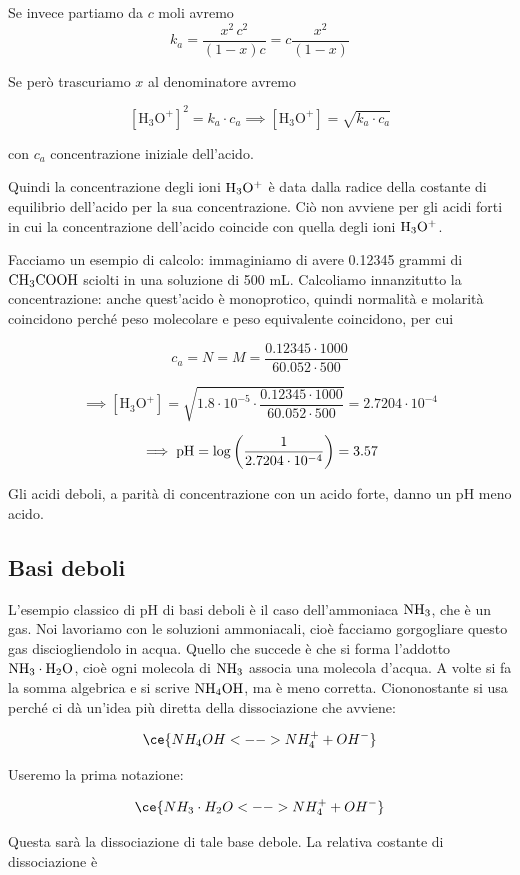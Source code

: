 Se invece partiamo da $c$ moli avremo
$$k_a = \frac{x^2 \, c^2}{(1-x)c}= c \frac{x^2}{(1-x)}$$

Se però trascuriamo $x$ al denominatore avremo

$$[\text{H}_3\text{O}^+]^2= k_a \cdot c_a \implies [\text{H}_3\text{O}^+] = \sqrt{k_a \cdot c_a}$$

con $c_a$ concentrazione iniziale dell'acido.

Quindi la concentrazione degli ioni $\rm H_3O^+$ è data dalla radice della costante di equilibrio dell'acido per la sua concentrazione. Ciò non avviene per gli acidi forti in cui la concentrazione dell'acido coincide con quella degli ioni $\rm H_3O^+$.

Facciamo un esempio di calcolo: immaginiamo di avere 0.12345 grammi di $\rm CH_3COOH$ sciolti in una soluzione di 500 mL. Calcoliamo innanzitutto la concentrazione: anche quest'acido è monoprotico, quindi normalità e molarità coincidono perché peso molecolare e peso equivalente coincidono, per cui

$$c_a=N=M=\frac{0.12345 \cdot 1000}{60.052 \cdot 500}$$

$$\implies [\text{H}_3\text{O}^+]=\sqrt{1.8 \cdot 10^{-5} \cdot \frac{0.12345 \cdot 1000}{60.052 \cdot 500}}=2.7204 \cdot 10^{-4}$$

$$\implies \rm pH=\log \left( \frac{1}{2.7204 \cdot 10^{-4}} \right)=3.57$$

Gli acidi deboli, a parità di concentrazione con un acido forte, danno un pH meno acido. 

\subsection{Basi deboli}

L'esempio classico di pH di basi deboli è il caso dell'ammoniaca $\rm NH_3$, che è un gas. Noi lavoriamo con le soluzioni ammoniacali, cioè facciamo gorgogliare questo gas disciogliendolo in acqua. Quello che succede è che si forma l'addotto $\rm NH_3 \cdot H_2O$, cioè ogni molecola di $\rm NH_3$ associa una molecola d'acqua. A volte si fa la somma algebrica e si scrive $\rm NH_4OH$, ma è meno corretta. Ciononostante si usa perché ci dà un'idea più diretta della dissociazione che avviene:

$$\ce{NH_4OH <--> NH_4^+ + OH^-}$$

Useremo la prima notazione:

$$\ce{NH_3 \cdot H_2O <--> NH_4^+ + OH^-}$$

Questa sarà la dissociazione di tale base debole. La relativa costante di dissociazione è

